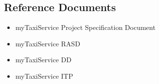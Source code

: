 \subsection{Reference Documents}
\begin{itemize}
	\item myTaxiService Project Specification Document
	\item myTaxiService RASD
	\item myTaxiService DD
	\item myTaxiService ITP
\end{itemize}